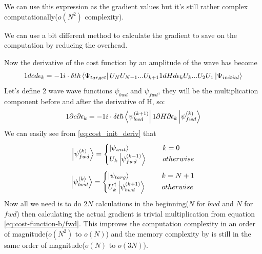 \documentclass[english, a4paper, 12pt, twoside]{article}
\numberwithin{equation}{section} %
\begin{document}
We can use this expression as the gradient values but it's still rather complex computationally($o(N^2)$ complexity).\par
We can use a bit different method to calculate the gradient to save on the computation by reducing the overhead.

Now the derivative of the cost function by an amplitude of the wave has become
\begin{equation} \label{eq:cost_init_deriv}
    1{dc}{d\epsilon_k} = -1{i\cdot \delta t}{\hbar} \bra{\Psi_{target}}U_N U_{N-1}... U_{k+1}1{dH}{d\epsilon_k} U_{k} ...U_2 U_1\ket{\Psi_{initial}} 
\end{equation}
Let's define 2 wave wave functions $\psi_{bwd}$ and $\psi_{fwd}$, they will be the multiplication component before and after the derivative of H, so:
\begin{equation} \label{eq:cost-function-b/fwd}
    1{\partial c}{\partial \epsilon_k} =  -1{i\cdot \delta t}{\hbar}\bra{\psi_{bwd}^{(k+1)}} 1{\partial H}{\partial \epsilon_k} \ket{\psi_{fwd}^{(k)}}
\end{equation}
We can easily see from \ref{eq:cost_init_deriv} that 
\[   
\ket{\psi_{fwd}^{(k)}} = 
     \begin{cases}
       \ket{\psi_{init}} &\quad\ k=0\\
       U_k \ket{\psi_{fwd}^{(k-1)}} &\quad\ otherwise\\
     \end{cases}
\]
\[   
\ket{\psi_{bwd}^{(k)}} = 
     \begin{cases}
       \ket{\psi_{targ}} &\quad\ k=N+1\\
       U_k^{\dag{}} \ket{\psi_{bwd}^{(k+1)}} &\quad\ otherwise\\
     \end{cases}
\]
Now all we need is to do $2N$ calculations in the beginning($N$ for $bwd$ and $N$ for $fwd$) then calculating the actual gradient is trivial multiplication from equation \ref{eq:cost-function-b/fwd}. This improves the computation complexity in an order of magnitude($o(N^2)$ to $o(N)$) and the memory complexity by is still in the same order of magnitude($o(N)$ to $o(3N)$).
\end{document}
